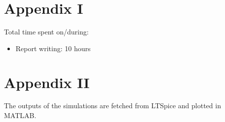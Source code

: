 \documentclass[letterpaper,12pt]{article}
\begin{document}
\section*{Appendix I}
Total time spent on/during:
\begin{itemize} 

	\item Report writing: 10 hours 
\end{itemize}
\section*{Appendix II}
The outputs of the simulations are fetched from LTSpice and plotted in MATLAB. 



\end{document}
